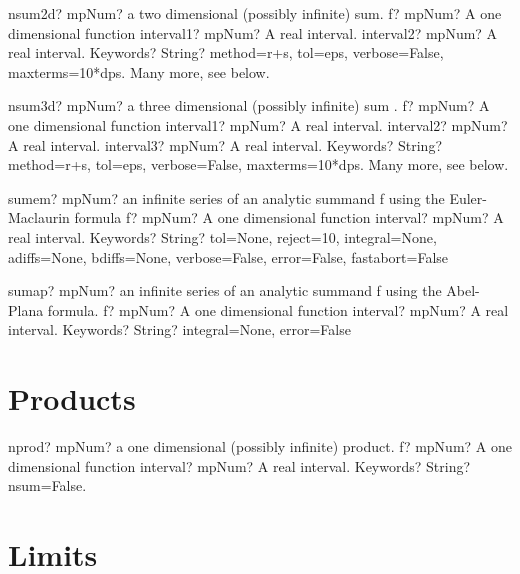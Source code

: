 \documentclass[12pt,a4paper,openany]{book}
\begin{document}
\begin{mpFunctionsExtract}
\mpFunctionFour
{nsum2d? mpNum? a two dimensional (possibly infinite) sum.}
{f? mpNum? A one dimensional function}
{interval1? mpNum? A real interval.}
{interval2? mpNum? A real interval.}
{Keywords? String? method=r+s, tol=eps, verbose=False, maxterms=10*dps. Many more, see below.}
\end{mpFunctionsExtract}

\begin{mpFunctionsExtract}
\mpFunctionFive
{nsum3d? mpNum? a three dimensional (possibly infinite) sum .}
{f? mpNum? A one dimensional function}
{interval1? mpNum? A real interval.}
{interval2? mpNum? A real interval.}
{interval3? mpNum? A real interval.}
{Keywords? String? method=r+s, tol=eps, verbose=False, maxterms=10*dps. Many more, see below.}
\end{mpFunctionsExtract}

\begin{mpFunctionsExtract}
\mpFunctionThree
{sumem? mpNum? an infinite series of an analytic summand f using the Euler-Maclaurin formula}
{f? mpNum? A one dimensional function}
{interval? mpNum? A real interval.}
{Keywords? String?  tol=None, reject=10, integral=None, adiffs=None, bdiffs=None, verbose=False, error=False, fastabort=False}
\end{mpFunctionsExtract}

\begin{mpFunctionsExtract}
\mpFunctionThree
{sumap? mpNum? an infinite series of an analytic summand f using the Abel-Plana formula.}
{f? mpNum? A one dimensional function}
{interval? mpNum? A real interval.}
{Keywords? String?  integral=None, error=False}
\end{mpFunctionsExtract}

\section{Products}

\begin{mpFunctionsExtract}
\mpFunctionThree
{nprod? mpNum? a one dimensional (possibly infinite) product.}
{f? mpNum? A one dimensional function}
{interval? mpNum? A real interval.}
{Keywords? String? nsum=False.}
\end{mpFunctionsExtract}

\section{Limits}
\end{document}
